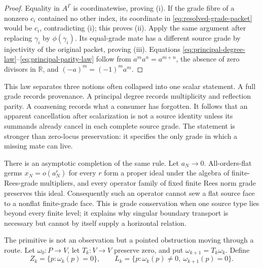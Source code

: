\documentclass[11pt]{article}
\theoremstyle{definition}
\theoremstyle{remark}
\newcommand{\R}{\mathbb R}
\begin{document}
\begin{proof}
Equality in \(A^\Gamma\) is coordinatewise, proving (i).  If the grade fibre
of a nonzero \(c_i\) contained no other index, its coordinate in
\eqref{eq:resolved-grade-packet} would be \(c_i\), contradicting (i); this
proves (ii).  Apply the same argument after replacing \(\gamma_i\) by
\(\phi(\gamma_i)\).  Its equal-grade mate has a different source grade by
injectivity of the original packet, proving (iii).  Equations
\eqref{eq:principal-degree-law}--\eqref{eq:principal-parity-law} follow from
\(a^ma^n=a^{m+n}\), the absence of zero divisors in \(\R\), and
\((-a)^m=(-1)^ma^m\).
\end{proof}

This law separates three notions often collapsed into one scalar statement.
A full grade records provenance.  A principal degree records multiplicity
and reflection parity.  A coarsening records what a consumer has forgotten.
It follows that an apparent cancellation after scalarization is not a source
identity unless its summands already cancel in each complete source grade.
The statement is stronger than zero-locus preservation: it specifies the
only grade in which a missing mate can live.

There is an asymptotic completion of the same rule.  Let \(a_N\to0\).
All-orders-flat germs \(x_N=o(a_N^r)\) for every \(r\) form a proper ideal
under the algebra of finite-Rees-grade multipliers, and every operator family
of fixed finite Rees norm grade preserves this ideal.  Consequently such an
operator cannot sew a flat source face to a nonflat finite-grade face.  This
is grade conservation when one source type lies beyond every finite level;
it explains why singular boundary transport is necessary but cannot by
itself supply a horizontal relation.

The primitive is not an observation but a pointed obstruction moving through
a route.  Let \(\omega_0:P\to V\), let \(T_k:V\to V\) preserve zero, and
put \(\omega_{k+1}=T_k\omega_k\).  Define
\[
 Z_k=\{p:\omega_k(p)=0\},\qquad
 L_k=\{p:\omega_k(p)\ne0,\ \omega_{k+1}(p)=0\}.
\tag{2.F0}\label{eq:first-loss-strata}
\]
\end{document}

